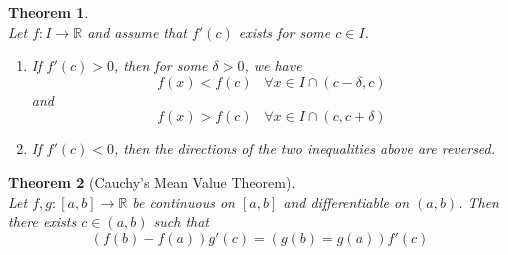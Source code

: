 \documentclass[12pt]{article}
\newtheorem{theorem}{Theorem}[section]
\theoremstyle{definition}
\begin{document}
\begin{theorem}
\hfill\\\normalfont Let $f:I\to\mathbb{R}$ and assume that $f'(c)$ exists for some $c\in I$.
\begin{enumerate}
	\item If $f'(c)>0$, then for some $\delta>0$, we have
	\[
f(x)<f(c)\;\;\;\forall x\in I\cap(c-\delta,c)
	\]
	and
	\[
f(x)>f(c)\;\;\;\forall x\in I\cap(c,c+\delta)
	\]
	\item If $f'(c)<0$, then the directions of the two inequalities above are reversed.
\end{enumerate}
\end{theorem}
\begin{theorem}[Cauchy's Mean Value Theorem]
\hfill\\\normalfont Let $f,g:[a,b]\to\mathbb{R}$ be continuous on $[a,b]$ and differentiable on $(a,b)$. Then there exists $c\in(a,b)$ such that
\[
(f(b)-f(a))g'(c)=(g(b)=g(a))f'(c)
\]
\end{theorem}
\end{document}
